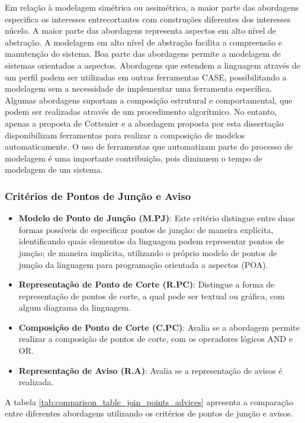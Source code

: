 Em relação à modelagem simétrica ou assimétrica, a maior parte das abordagens especifica os interesses entrecortantes com construções diferentes dos
interesses núcelo. A maior parte das abordagens representa aspectos em alto nível de abstração. A modelagem em alto nível de abstração facilita a
compreensão e manutenção do sistema. Boa parte das abordagens permite a modelagem de sistemas orientados a aspectos. Abordagens que estendem a
linguagem através de um perfil podem ser utilizadas em outras ferramentas CASE, possibilitando a modelagem sem a necessidade de implementar uma
ferramenta específica. Algumas abordagens suportam a composição estrutural e comportamental, que podem ser realizadas através de um procedimento
algorítmico. No entanto, apenas a proposta de Cottenier e a abordagem proposta por esta dissertação disponibilizam ferramentas para realizar 
a composição de modelos automaticamente. O uso de ferramentas que automatizam parte do processo de modelagem é uma importante contribuição, pois
diminuem o tempo de modelagem de um sistema.

\subsubsection{Critérios de Pontos de Junção e Aviso}

\begin{itemize}
	\item \textbf{Modelo de Ponto de Junção (M.PJ)}: Este critério distingue entre duas formas possíveis de especificar pontos de junção: de maneira
	explícita, identificando quais elementos da linguagem podem representar pontos de junção; de maneira implícita, utilizando o próprio modelo de pontos de junção
	da linguagem para programação orientada a aspectos (POA).
	\item \textbf{Representação de Ponto de Corte (R.PC)}: Distingue a forma de representação de pontos de corte, a qual pode ser textual ou gráfica,
	com algum diagrama da linguagem. 
	\item \textbf{Composição de Ponto de Corte (C.PC)}: Avalia se a abordagem permite realizar a composição de pontos de corte, com os operadores
	lógicos AND e OR. 
	\item \textbf{Representação de Aviso (R.A)}: Avalia se a representação de avisos é realizada.
\end{itemize}

A tabela \ref{tab:comparison_table_join_points_advices} apresenta a comparação entre diferentes abordagens utilizando os critérios de pontos de
junção e avisos.

